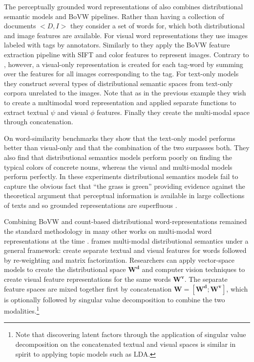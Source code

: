 The perceptually grounded word representations of \cite{bruni2012distributional}
also combines distributional semantic models and BoVW pipelines.
Rather than having a collection of documents $<D, I>$ they consider a set of words for, which
both distributional and image features are available. For visual word representations
they use images labeled with tags by annotators. Similarly to \cite{feng2010visual} they
apply the BoVW feature extraction pipeline with SIFT and color features to
represent images. Contrary to \cite{feng2010visual}, however,
a visual-only representation is created for each tag-word by summing over the features
for all images corresponding to the tag.
For text-only models they construct several types of distributional semantic spaces
from text-only corpora unrelated to the images.
Note that as in the previous example they wish to create a multimodal
word representation and applied separate functions to extract textual $\psi$ and visual
$\phi$ features. Finally they create the multi-modal space through concatenation.

On word-similarity benchmarks they show that the text-only model performs better than visual-only
and that the combination of the two surpasses both.
They also find that distributional semantics
models perform poorly on finding the typical colors of concrete nouns,
whereas the visual and multi-modal models perform perfectly. In these experiments
distributional semantics models fail to capture the obvious fact that ``the grass is green''
providing evidence against the theoretical argument that perceptual information is available in
large collections of texts and so grounded representations are superfluous \citep{louwerse2011symbol}.


Combining BoVW and count-based distributional word-representations remained the standard methodology
in many other works on multi-modal word representations at the time
\citep{bruni2011distributional,leong2011going,leong2011measuring}.
\cite{bruni2014multimodal} frames multi-modal distributional semantics under a general framework:
create separate textual and visual features for words followed by
re-weighting and matrix factorization. Researchers can apply vector-space
models to create the distributional space $\mathbf{W^d}$ and computer vision techniques to create
visual feature representations for the same words $\mathbf{W^v}$. The separate feature spaces
are mixed together  first  by concatenation $\mathbf{W} = [\mathbf{W^d};\mathbf{W^v}]$, which is
optionally followed by singular value decomposition
to combine the two modalities.\footnote{Note that discovering latent factors through the application
of singular value decomposition on the concatenated textual and visual spaces is similar in spirit
to applying topic models such as LDA.}

